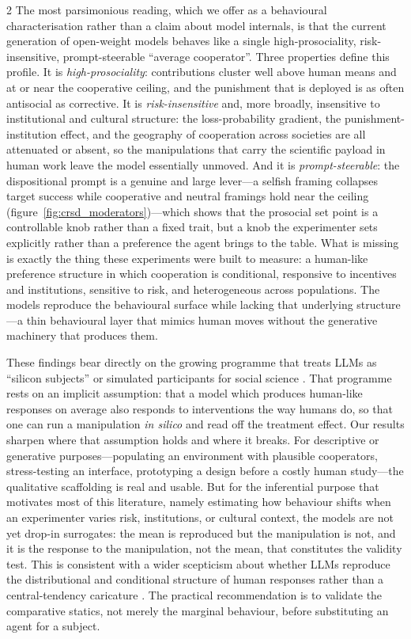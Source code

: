 \documentclass[openacc]{rsproca_new}%
\begin{document}
\begin{multicols}{2}
The most parsimonious reading, which we offer as a behavioural characterisation rather than a claim about model internals, is that the current generation of open-weight models behaves like a single high-prosociality, risk-insensitive, prompt-steerable ``average cooperator''. Three properties define this profile. It is \emph{high-prosociality}: contributions cluster well above human means and at or near the cooperative ceiling, and the punishment that is deployed is as often antisocial as corrective. It is \emph{risk-insensitive} and, more broadly, insensitive to institutional and cultural structure: the loss-probability gradient, the punishment-institution effect, and the geography of cooperation across societies are all attenuated or absent, so the manipulations that carry the scientific payload in human work leave the model essentially unmoved. And it is \emph{prompt-steerable}: the dispositional prompt is a genuine and large lever---a selfish framing collapses target success while cooperative and neutral framings hold near the ceiling (figure~\ref{fig:crsd_moderators})---which shows that the prosocial set point is a controllable knob rather than a fixed trait, but a knob the experimenter sets explicitly rather than a preference the agent brings to the table. What is missing is exactly the thing these experiments were built to measure: a human-like preference structure in which cooperation is conditional, responsive to incentives and institutions, sensitive to risk, and heterogeneous across populations. The models reproduce the behavioural surface while lacking that underlying structure---a thin behavioural layer that mimics human moves without the generative machinery that produces them.

These findings bear directly on the growing programme that treats LLMs as ``silicon subjects'' or simulated participants for social science \cite{argyle2023out, horton2023llm, park2023generative}. That programme rests on an implicit assumption: that a model which produces human-like responses on average also responds to interventions the way humans do, so that one can run a manipulation \emph{in silico} and read off the treatment effect. Our results sharpen where that assumption holds and where it breaks. For descriptive or generative purposes---populating an environment with plausible cooperators, stress-testing an interface, prototyping a design before a costly human study---the qualitative scaffolding is real and usable. But for the inferential purpose that motivates most of this literature, namely estimating how behaviour shifts when an experimenter varies risk, institutions, or cultural context, the models are not yet drop-in surrogates: the mean is reproduced but the manipulation is not, and it is the response to the manipulation, not the mean, that constitutes the validity test. This is consistent with a wider scepticism about whether LLMs reproduce the distributional and conditional structure of human responses rather than a central-tendency caricature \cite{mei2024turing, tjuatja2024llms}. The practical recommendation is to validate the comparative statics, not merely the marginal behaviour, before substituting an agent for a subject.


\end{multicols}
\end{document}
